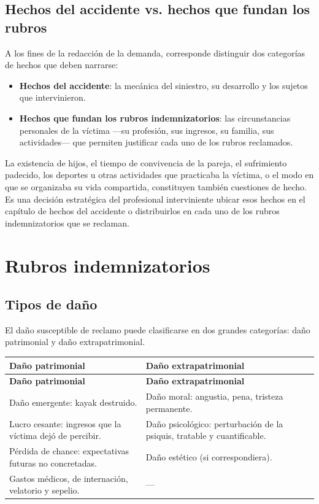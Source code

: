 \documentclass[12pt,oneside]{book}
\begin{document}
\section{Hechos del accidente vs. hechos que fundan los rubros}

A los fines de la redacción de la demanda, corresponde distinguir dos categorías de hechos que deben narrarse:

\begin{itemize}
    \item \textbf{Hechos del accidente}: la mecánica del siniestro, su desarrollo y los sujetos que intervinieron.
    \item \textbf{Hechos que fundan los rubros indemnizatorios}: las circunstancias personales de la víctima —su profesión, sus ingresos, su familia, sus actividades— que permiten justificar cada uno de los rubros reclamados.
\end{itemize}

\begin{note}
La existencia de hijos, el tiempo de convivencia de la pareja, el sufrimiento padecido, los deportes u otras actividades que practicaba la víctima, o el modo en que se organizaba su vida compartida, constituyen también cuestiones de hecho. Es una decisión estratégica del profesional interviniente ubicar esos hechos en el capítulo de hechos del accidente o distribuirlos en cada uno de los rubros indemnizatorios que se reclaman.
\end{note}

\chapter{Rubros indemnizatorios}

\section{Tipos de daño}

El daño susceptible de reclamo puede clasificarse en dos grandes categorías: daño patrimonial y daño extrapatrimonial.

\begin{longtable}{>{\raggedright\arraybackslash}p{} >{\raggedright\arraybackslash}p{}}
\toprule
\textbf{Daño patrimonial} & \textbf{Daño extrapatrimonial} \\
\midrule
\endfirsthead
\toprule
\textbf{Daño patrimonial} & \textbf{Daño extrapatrimonial} \\
\midrule
\endhead
Daño emergente: kayak destruido. & Daño moral: angustia, pena, tristeza permanente. \\
Lucro cesante: ingresos que la víctima dejó de percibir. & Daño psicológico: perturbación de la psiquis, tratable y cuantificable. \\
Pérdida de chance: expectativas futuras no concretadas. & Daño estético (si correspondiera). \\
Gastos médicos, de internación, velatorio y sepelio. & --- \\
\bottomrule
\end{longtable}
\end{document}
